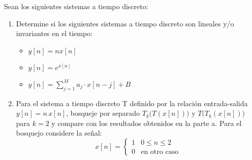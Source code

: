 \documentclass[
  11pt,
  letterpaper,
   addpoints,
  ]{exam}
\begin{document}
\begin{questions}
\question Sean los siguientes sistemas a tiempo discreto:

\begin{enumerate}
\item Determine si los siguientes sistemas a tiempo discreto son lineales y/o invariantes en el tiempo:
\begin{itemize}
\item $y[n] = nx[n]$
\item $y[n] = e^{x[n]}$
\item $y[n] = \sum_{j=1}^{M} a_j \cdot x[n-j] + B$
\end{itemize}

\item Para el sistema a tiempo discreto T definido por la relación entrada-salida $y[n] = n\,x[n]$, bosqueje por separado $T_k\big(T(x[n])\big)$ y $T\big(T_k(x[n])\big)$ para $k = 2$ y compare con los resultados obtenidos en la parte a. Para el bosquejo considere la señal:
\begin{equation}
x[n] = \begin{cases}
1 & 0 \leq n \leq 2 \\
0 & \text{en otro caso}
\end{cases}
\end{equation}
\end{enumerate}
\begin{solution}

\end{solution}
\end{questions}
\end{document}
